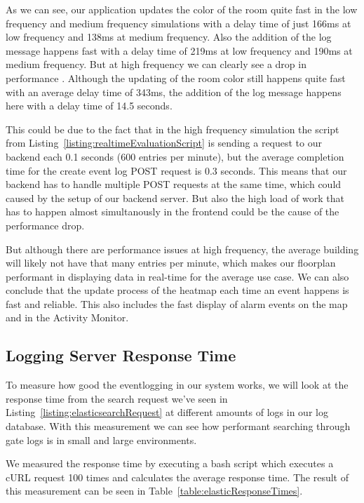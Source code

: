 As we can see, our application updates the color of the room quite fast in the low frequency and medium frequency simulations with a delay time of just 166ms at low frequency and 138ms at medium frequency.
Also the addition of the log message happens fast with a delay time of 219ms at low frequency and 190ms at medium frequency.
But at high frequency we can clearly see a drop in performance . Although the updating of the room color still happens quite fast with an average delay time of 343ms, the addition of the log message happens here with a delay time of 14.5 seconds. 

This could be due to the fact that in the high frequency simulation the script from Listing~\ref{listing:realtimeEvaluationScript} is sending a request to our backend each 0.1 seconds (600 entries per minute), but the average completion time for the create event log POST request is 0.3 seconds. This means that our backend has to handle multiple POST requests at the same time, which could caused by the setup of our backend server. But also the high load of work that has to happen almost simultanously in the frontend could be the cause of the performance drop. 

But although there are performance issues at high frequency, the average building will likely not have that many entries per minute, which makes our floorplan performant in displaying data in real-time for the average use case. We can also conclude that the update process of the heatmap each time an event happens is fast and reliable. This also includes the fast display of alarm events on the map and in the Activity Monitor.

\subsection{Logging Server Response Time}

To measure how good the eventlogging in our system works, we will look at the response time from the search request we've seen in Listing~\ref{listing:elasticsearchRequest}
at different amounts of logs in our log database. With this measurement we can see how performant searching through gate logs is in small and large environments. 

We measured the response time by executing a bash script which executes a cURL request 100 times and calculates the average response time. 
The result of this measurement can be seen in Table~\ref{table:elasticResponseTimes}.
 
